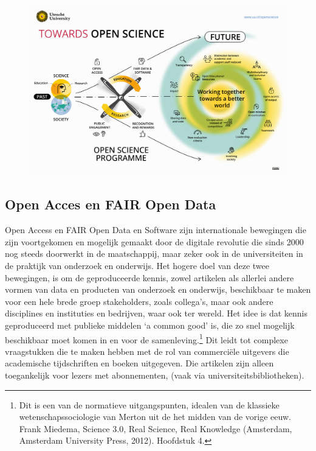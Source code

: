 \documentclass{jote-book}
\begin{document}
	\begin{figure}
		\includegraphics[width=\linewidth]{media/image1.png}

		\caption{}

		\label{fig:rId13}


	\end{figure}



	\subsection{Open Acces en FAIR Open Data}



	Open Access en FAIR Open Data en Software zijn internationale bewegingen die zijn voortgekomen en mogelijk gemaakt door de digitale revolutie die sinds 2000 nog steeds doorwerkt in de maatschappij, maar zeker ook in de universiteiten in de praktijk van onderzoek en onderwijs. Het hogere doel van deze twee bewegingen, is om de geproduceerde kennis, zowel artikelen als allerlei andere vormen van data en producten van onderzoek en onderwijs, beschikbaar te maken voor een hele brede groep stakeholders, zoals collega's, maar ook andere disciplines en instituties en bedrijven, waar ook ter wereld. Het idee is dat kennis geproduceerd met publieke middelen ‘a common good' is, die zo snel mogelijk beschikbaar moet komen in en voor de samenleving.\footnote{Dit is een van de normatieve uitgangspunten, idealen van de klassieke wetenschapssociologie van Merton uit de het midden van de vorige eeuw. Frank Miedema, Science 3.0, Real Science, Real Knowledge (Amsterdam, Amsterdam University Press, 2012). Hoofdstuk 4.} Dit leidt tot complexe vraagstukken die te maken hebben met de rol van commerciële uitgevers die academische tijdschriften en boeken uitgegeven. Die artikelen zijn alleen toegankelijk voor lezers met abonnementen, (vaak via universiteitsbibliotheken).
\end{document}
